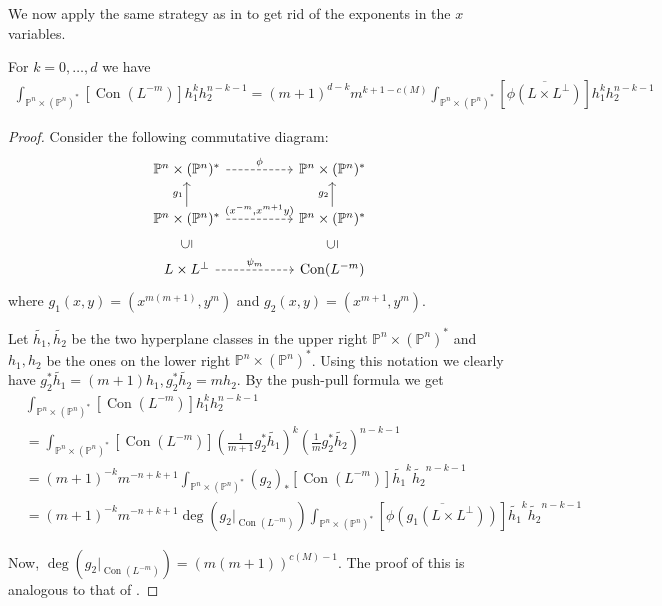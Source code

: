 \documentclass[12pt,a4paper,english]{scrartcl}
\newcommand{\PP}{\mathbb{P}}
\DeclareMathOperator{\Con}{Con}
\begin{document}
We now apply the same strategy as in  to get rid of the exponents in the $x$ variables.
\begin{proposition}\label{prop: gettingridofthek}
        For $k=0,\ldots,d$ we have \begin{align*}
            \int_{\PP^n \times (\PP^n)^*}[\Con(L^{-m})]h_1^kh_2^{n-k-1}=(m+1)^{d-k}m^{k+1-c(M)}\int_{\PP^n \times (\PP^n)^*}[\overline{\phi(L\times L^\perp)}] h_1^kh_2^{n-k-1}
    \end{align*}
\end{proposition}
\begin{proof}
        Consider the following commutative diagram:
    \begin{equation}
      \label{eq:diagramfork}
      \begin{tikzcd}
          \PP^n \times (\PP^n)^* \arrow[rr,dashed,"\phi"] & & \PP^n \times (\PP^n)^* \\
        \PP^n \times (\PP^n)^* \arrow[u,"g_1"]\arrow[rr,dashed, "{(x^{-m},x^{m+1}y)}"] & & \PP^n \times (\PP^n)^* \arrow[u,"g_2"]\\
        L\times L^\perp \arrow[rr,dashed,"\psi_m"] \arrow[u,"\subseteq",phantom,sloped] & &\Con(L^{-m}) \arrow[u,"\subseteq",phantom,sloped]
      \end{tikzcd}
  \end{equation}
where $g_1(x,y) = (x^{m(m+1)},y^m)$ and $g_2(x,y) = (x^{m+1},y^m)$.

Let $\widetilde{h_1},\widetilde{h_2}$ be the two hyperplane classes in the upper right $\PP^n \times (\PP^n)^*$ and $h_1,h_2$ be the ones on the lower right $\PP^n \times (\PP^n)^*$. Using this notation we clearly have $g_2^*\widetilde{h_1}=(m+1)h_1, g_2^*\widetilde{h_2}=mh_2$. By the push-pull formula we get \begin{align*}
      &\int_{\PP^n \times (\PP^n)^*}[\Con(L^{-m})]h_1^kh_2^{n-k-1}\\&=\int_{\PP^n \times (\PP^n)^*}[\Con(L^{-m})]\left(\frac{1}{m+1}g_2^*\widetilde{h_1}\right)^k\left(\frac{1}{m}g_2^*\widetilde{h_2}\right)^{n-k-1}\\&=(m+1)^{-k}m^{-n+k+1}\int_{\PP^n \times (\PP^n)^*}(g_2)_*[\Con(L^{-m})]\widetilde{h_1}^k\widetilde{h_2}^{n-k-1} \\
      &=(m+1)^{-k}m^{-n+k+1}\deg(g_2|_{\Con(L^{-m})})\int_{\PP^n \times (\PP^n)^*}[\overline{\phi(g_1(L\times L^\perp))}]\widetilde{h_1}^k\widetilde{h_2}^{n-k-1}
  \end{align*}
  
Now, $\deg(g_2|_{\Con(L^{-m})})=(m(m+1))^{c(M)-1}$. The proof of this is analogous to that of .


\end{proof}
\end{document}
